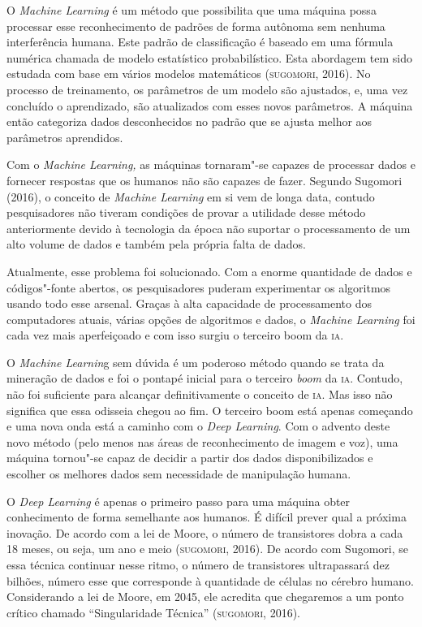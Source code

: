 O \emph{Machine Learning} é um método que possibilita que uma máquina
possa processar esse reconhecimento de padrões de forma autônoma sem
nenhuma interferência humana. Este padrão de classificação é baseado em
uma fórmula numérica chamada de modelo estatístico probabilístico. Esta
abordagem tem sido estudada com base em vários modelos matemáticos
(\textsc{sugomori}, 2016). No processo de treinamento, os parâmetros de um modelo
são ajustados, e, uma vez concluído o aprendizado, são atualizados com
esses novos parâmetros. A máquina então categoriza dados desconhecidos
no padrão que se ajusta melhor aos parâmetros aprendidos.

Com o \emph{Machine Learning,} as máquinas tornaram"-se capazes de
processar dados e fornecer respostas que os humanos não são capazes de
fazer. Segundo Sugomori (2016), o conceito de \emph{Machine Learning} em
si vem de longa data, contudo pesquisadores não tiveram condições de
provar a utilidade desse método anteriormente devido à tecnologia da
época não suportar o processamento de um alto volume de dados e também
pela própria falta de dados.

Atualmente, esse problema foi solucionado. Com a enorme quantidade de
dados e códigos"-fonte abertos, os pesquisadores puderam experimentar os
algoritmos usando todo esse arsenal. Graças à alta capacidade de
processamento dos computadores atuais, várias opções de algoritmos e
dados, o \emph{Machine Learning} foi cada vez mais aperfeiçoado e com
isso surgiu o terceiro boom da \textsc{ia}.

O \emph{Machine Learnin}g sem dúvida é um poderoso método quando se
trata da mineração de dados e foi o pontapé inicial para o terceiro
\emph{boom} da \textsc{ia}. Contudo, não foi suficiente para alcançar
definitivamente o conceito de \textsc{ia}. Mas isso não significa que essa
odisseia chegou ao fim. O terceiro boom está apenas começando e uma nova
onda está a caminho com o \emph{Deep Learning}. Com o advento deste novo
método (pelo menos nas áreas de reconhecimento de imagem e voz), uma
máquina tornou"-se capaz de decidir a partir dos dados disponibilizados e
escolher os melhores dados sem necessidade de manipulação humana.

O \emph{Deep Learning} é apenas o primeiro passo para uma máquina obter
conhecimento de forma semelhante aos humanos. É difícil prever qual a
próxima inovação. De acordo com a lei de Moore, o número de transistores
dobra a cada 18 meses, ou seja, um ano e meio (\textsc{sugomori}, 2016). De
acordo com Sugomori, se essa técnica continuar nesse ritmo, o número de
transistores ultrapassará dez bilhões, número esse que corresponde à
quantidade de células no cérebro humano. Considerando a lei de Moore, em
2045, ele acredita que chegaremos a um ponto crítico chamado
``Singularidade Técnica'' (\textsc{sugomori}, 2016).

